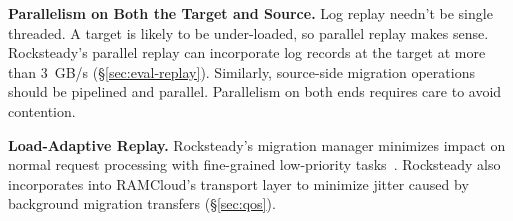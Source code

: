 
\noindent
\textbf{Parallelism on Both the Target and Source.} Log replay needn't be
single threaded.  A target is likely to be under-loaded, so parallel
replay makes sense. Rocksteady's parallel replay can incorporate log records
at the target at more than 3~GB/s (\S\ref{sec:eval-replay}). Similarly,
source-side migration operations should be pipelined and parallel. Parallelism
on both ends requires care to avoid contention.

\noindent
\textbf{Load-Adaptive Replay.} Rocksteady's migration manager minimizes impact
on normal request processing with fine-grained low-priority
tasks~\cite{morsel-driven-parallelism,sparrow}. Rocksteady also incorporates
into RAMCloud's transport layer to minimize jitter caused by background
migration transfers (\S\ref{sec:qos}).
